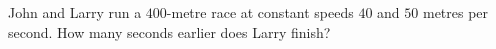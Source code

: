 John and Larry run a $400$-metre race at constant speeds $40$ and $50$ metres per second. How many seconds earlier does Larry finish?
